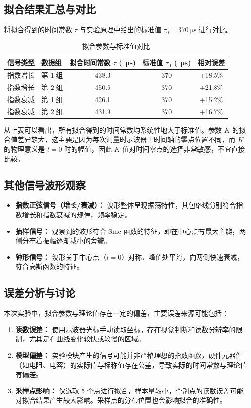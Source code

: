 \documentclass[12pt, a4paper]{ctexrep}
\begin{document}
\subsection{拟合结果汇总与对比}
将拟合得到的时间常数 $\tau$ 与实验原理中给出的标准值 $\tau_0 = \SI{370}{\micro\second}$ 进行对比。
\begin{table}[htbp]
    \centering
    \caption{拟合参数与标准值对比}
    \label{tab:comparison}
    \begin{tabular}{llccc}
        \toprule
        \textbf{信号类型} & \textbf{数据组} & \textbf{拟合时间常数 $\tau$ (\SI{}{\micro\second})} & \textbf{标准值 $\tau_0$ (\SI{}{\micro\second})} & \textbf{相对误差} \\
        \midrule
        指数增长 & 第 1 组 & 438.3 & 370 & +18.5\% \\
        指数增长 & 第 2 组 & 450.6 & 370 & +21.8\% \\
        \midrule
        指数衰减 & 第 1 组 & 426.1 & 370 & +15.2\% \\
        指数衰减 & 第 2 组 & 431.9 & 370 & +16.7\% \\
        \bottomrule
    \end{tabular}
\end{table}
从上表可以看出，所有拟合得到的时间常数均系统性地大于标准值。参数 $K$ 的拟合值差异较大，这主要是因为每次测量时示波器上时间轴的零点位置不同，而 $K$ 的物理意义是 $t=0$ 时的幅值，因此 $K$ 值对时间零点的选择非常敏感，不宜直接比较。

\subsection{其他信号波形观察}
\begin{itemize}
    \item \textbf{指数正弦信号（增长/衰减）：} 波形整体呈现振荡特性，其包络线分别符合指数增长和指数衰减的规律，频率稳定。
    \item \textbf{抽样信号：} 观察到的波形符合 Sinc 函数的特征，即在中心点有最大主瓣，两侧分布着振幅逐渐减小的旁瓣。
    \item \textbf{钟形信号：} 波形关于中心点（$t=0$）对称，峰值处平滑，向两侧快速衰减，符合高斯函数的特征。
\end{itemize}

\subsection{误差分析与讨论}
本次实验中，拟合参数与理论值存在一定的偏差，主要误差来源可能包括：
\begin{enumerate}
    \item \textbf{读数误差：} 使用示波器光标手动读取坐标，存在视觉判断和读数分辨率的限制，尤其是在曲线变化较快或较慢的区域。
    \item \textbf{模型偏差：} 实验模块产生的信号可能并非严格理想的指数函数，硬件元器件（如电阻、电容）的实际值与标称值存在公差，导致实际的时间常数与理论值有偏差。
    \item \textbf{采样点影响：} 仅选取 5 个点进行拟合，样本量较小，个别点的读数误差可能对拟合结果产生较大影响。采样点的分布位置也会影响拟合的准确性。
\end{enumerate}
\end{document}
